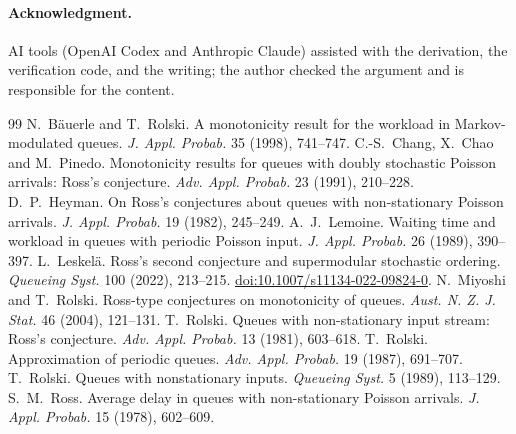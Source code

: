\documentclass[11pt]{article}
\theoremstyle{remark}
\begin{document}
\paragraph{Acknowledgment.} AI tools (OpenAI Codex and Anthropic Claude) assisted with the derivation, the verification code, and the writing; the author checked the argument and is responsible for the content.

\begin{thebibliography}{99}
 N.~B\"auerle and T.~Rolski. A monotonicity result for the workload in Markov-modulated queues. \emph{J. Appl. Probab.} 35 (1998), 741--747.
 C.-S.~Chang, X.~Chao and M.~Pinedo. Monotonicity results for queues with doubly stochastic Poisson arrivals: Ross's conjecture. \emph{Adv. Appl. Probab.} 23 (1991), 210--228.
 D.~P.~Heyman. On Ross's conjectures about queues with non-stationary Poisson arrivals. \emph{J. Appl. Probab.} 19 (1982), 245--249.
 A.~J.~Lemoine. Waiting time and workload in queues with periodic Poisson input. \emph{J. Appl. Probab.} 26 (1989), 390--397.
 L.~Leskel\"a. Ross's second conjecture and supermodular stochastic ordering. \emph{Queueing Syst.} 100 (2022), 213--215. \href{https://doi.org/10.1007/s11134-022-09824-0}{doi:10.1007/s11134-022-09824-0}.
 N.~Miyoshi and T.~Rolski. Ross-type conjectures on monotonicity of queues. \emph{Aust. N. Z. J. Stat.} 46 (2004), 121--131.
 T.~Rolski. Queues with non-stationary input stream: Ross's conjecture. \emph{Adv. Appl. Probab.} 13 (1981), 603--618.
 T.~Rolski. Approximation of periodic queues. \emph{Adv. Appl. Probab.} 19 (1987), 691--707.
 T.~Rolski. Queues with nonstationary inputs. \emph{Queueing Syst.} 5 (1989), 113--129.
 S.~M.~Ross. Average delay in queues with non-stationary Poisson arrivals. \emph{J. Appl. Probab.} 15 (1978), 602--609.
\end{thebibliography}
\end{document}
